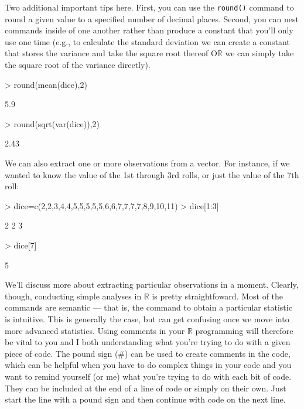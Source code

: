 \documentclass[12pt]{article}
\begin{document}
Two additional important tips here. First, you can use the \verb|round()| command to round a given value to a specified number of decimal places. Second, you can nest commands inside of one another rather than produce a constant that you'll only use one time (e.g., to calculate the standard deviation we can create a constant that stores the variance and take the square root thereof O$\mathbb{R}$ we can simply take the square root of the variance directly).
\begin{Schunk}
\begin{Sinput}
> round(mean(dice),2)
\end{Sinput}
\begin{Soutput}
[1] 5.9
\end{Soutput}
\begin{Sinput}
> round(sqrt(var(dice)),2)
\end{Sinput}
\begin{Soutput}
[1] 2.43
\end{Soutput}
\end{Schunk}

We can also extract one or more observations from a vector. For instance, if we wanted to know the value of the 1st through 3rd rolls, or just the value of the 7th roll:
\begin{Schunk}
\begin{Sinput}
> dice=c(2,2,3,4,4,5,5,5,5,5,6,6,7,7,7,7,8,9,10,11)
> dice[1:3]
\end{Sinput}
\begin{Soutput}
[1] 2 2 3
\end{Soutput}
\begin{Sinput}
> dice[7]
\end{Sinput}
\begin{Soutput}
[1] 5
\end{Soutput}
\end{Schunk}
We'll discuss more about extracting particular observations in a moment. Clearly, though, conducting simple analyses in $\mathbb{R}$ is pretty straightfoward. Most of the commands are semantic --- that is, the command to obtain a particular statistic is intuitive. This is generally the case, but can get confusing once we move into more advanced statistics. Using comments in your $\mathbb{R}$ programming will therefore be vital to you and I both understanding what you're trying to do with a given piece of code. The pound sign (\#) can be used to create comments in the code, which can be helpful when you have to do complex things in your code and you want to remind yourself (or me) what you're trying to do with each bit of code. They can be included at the end of a line of code or simply on their own. Just start the line with a pound sign and then continue with code on the next line.
\end{document}
